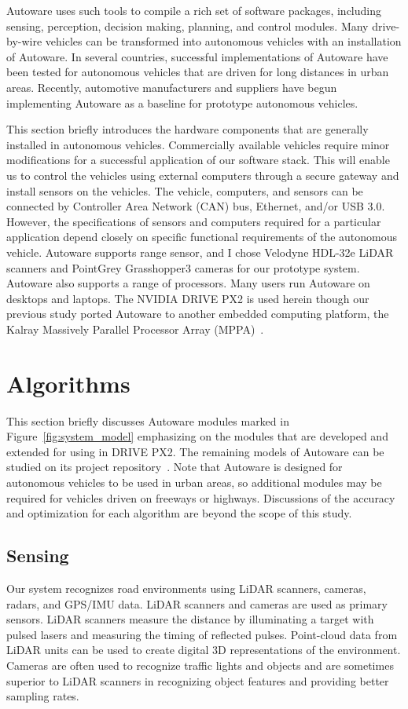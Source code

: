 Autoware uses such tools to compile a rich set of software packages, including sensing,
perception, decision making, planning, and control modules.
Many drive-by-wire vehicles can be transformed into autonomous vehicles
with an installation of Autoware.
In several countries, successful implementations of Autoware have been tested for
autonomous vehicles that are driven for long distances in urban
areas.
Recently, automotive manufacturers and suppliers have begun
implementing Autoware as a baseline for prototype autonomous vehicles.

This section briefly introduces the hardware components that are generally installed in autonomous vehicles.
Commercially available vehicles require minor modifications for a successful application of
our software stack.
This will enable us to control the vehicles using external computers through
a secure gateway and install sensors on the vehicles.
The vehicle, computers, and sensors can be connected by Controller Area Network
(CAN) bus, Ethernet, and/or USB 3.0.
However, the specifications of sensors and computers required for a particular application depend closely on
specific functional requirements of the autonomous vehicle.
Autoware supports range sensor, and I chose Velodyne HDL-32e LiDAR scanners and PointGrey
Grasshopper3 cameras for our prototype system.
Autoware also supports a range of processors.
Many users run Autoware on desktops and laptops.
The NVIDIA DRIVE PX2 is used herein though our previous
study ported Autoware to another embedded computing platform,
the Kalray Massively Parallel Processor Array
(MPPA)~\cite{yuya2017exploring}. 

\section{Algorithms}
\label{sec:algorithms}

This section briefly discusses Autoware modules marked in
Figure~\ref{fig:system_model} emphasizing on the modules
that are developed and extended for using in DRIVE PX2.
The remaining models of Autoware can be studied on its
project repository~\cite{autoware}.
Note that Autoware is designed for autonomous vehicles to be used in urban areas, so additional modules
may be required for vehicles driven on freeways or highways.
Discussions of the accuracy and optimization for each algorithm are beyond
the scope of this study.

\subsection{Sensing}
\label{sec:sensing}
Our system recognizes road environments using
LiDAR scanners, cameras, radars, and GPS/IMU data.
LiDAR scanners and cameras are used as primary sensors.
LiDAR scanners measure the distance by illuminating a
target with pulsed lasers and measuring the timing of reflected pulses.
Point-cloud data from LiDAR units can be used to create digital
3D representations of the environment.
Cameras are often used to recognize traffic lights and objects and are sometimes
superior to LiDAR scanners in recognizing object features and providing better sampling rates.

